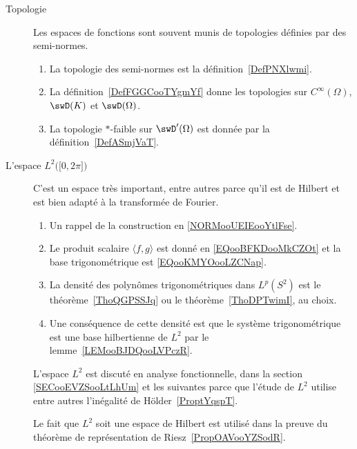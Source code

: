 \begin{description}
    \item[Topologie]

        Les espaces de fonctions sont souvent munis de topologies définies par des semi-normes.

        \begin{enumerate}
            \item
                La topologie des semi-normes est la définition~\ref{DefPNXlwmi}.
            \item
                La définition~\ref{DefFGGCooTYgmYf} donne les topologies sur \(  C^{\infty}(\Omega)\), \( \swD(K)\) et \( \swD(\Omega)\).
            \item
                La topologie \( *\)-faible sur \( \swD'(\Omega)\) est donnée par la définition~\ref{DefASmjVaT}.
        \end{enumerate}

    \item[L'espace \( { L^2\big( \mathopen[ 0 , 2\pi \mathclose] \big) } \)]

        C'est un espace très important, entre autres parce qu'il est de Hilbert et est bien adapté à la transformée de Fourier.

        \begin{enumerate}
        \item
            Un rappel de la construction en \ref{NORMooUEIEooYtlFse}.
            \item
                Le produit scalaire \( \langle f, g\rangle \) est donné en \eqref{EQooBFKDooMkCZOt} et la base trigonométrique est \eqref{EQooKMYOooLZCNap}.
            \item
                La densité des polynômes trigonométriques dans \( L^p(S^2)\) est le théorème~\ref{ThoQGPSSJq} ou le théorème~\ref{ThoDPTwimI}, au choix.
            \item
                Une conséquence de cette densité est que le système trigonométrique est une base hilbertienne de \( L^2\) par le lemme~\ref{LEMooBJDQooLVPczR}.
        \end{enumerate}

            L'espace \( L^2\) est discuté en analyse fonctionnelle, dans la section \ref{SECooEVZSooLtLhUm} et les suivantes parce que l'étude de \( L^2\) utilise entre autres l'inégalité de Hölder~\ref{ProptYqspT}.

        Le fait que \( L^2\) soit une espace de Hilbert est utilisé dans la preuve du théorème de représentation de Riesz~\ref{PropOAVooYZSodR}.

\end{description}


